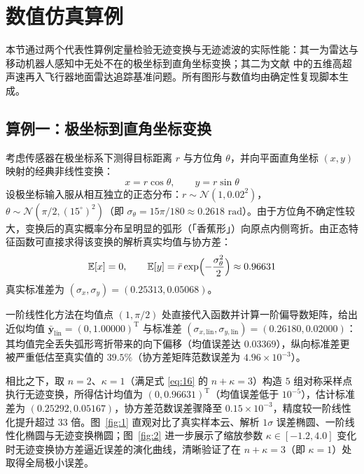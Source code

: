 \section{数值仿真算例}\label{sec:sim}

本节通过两个代表性算例定量检验无迹变换与无迹滤波的实际性能：其一为雷达与移动机器人感知中无处不在的极坐标到直角坐标变换；其二为文献 \cite{r06,r08} 中的五维高超声速再入飞行器地面雷达追踪基准问题。所有图形与数值均由确定性复现脚本生成。

\subsection{算例一：极坐标到直角坐标变换}\label{sec:sim-polar}

考虑传感器在极坐标系下测得目标距离 $r$ 与方位角 $\theta$，并向平面直角坐标 $(x, y)$ 映射的经典非线性变换：
\begin{equation}\label{eq:19}
x = r \cos\theta, \qquad y = r \sin\theta
\end{equation}
设极坐标输入服从相互独立的正态分布：$r \sim \mathcal{N}(1, 0.02^2)$，$\theta \sim \mathcal{N}(\pi/2, (15^\circ)^2)$（即 $\sigma_\theta = 15\pi/180 \approx 0.2618\text{ rad}$）。由于方位角不确定性较大，变换后的真实概率分布呈明显的弧形（「香蕉形」）向原点内侧弯折。由正态特征函数可直接求得该变换的解析真实均值与协方差：
\begin{equation}\label{eq:20}
\mathbb{E}[x] = 0, \qquad \mathbb{E}[y] = \bar{r}\exp\Bigl(-\frac{\sigma_\theta^2}{2}\Bigr) \approx 0.96631
\end{equation}
真实标准差为 $(\sigma_x, \sigma_y) = (0.25313, 0.05068)$。

一阶线性化方法在均值点 $(1, \pi/2)$ 处直接代入函数并计算一阶偏导数矩阵，给出近似均值 $\bar{\bm{y}}_{\text{lin}} = (0, 1.00000)^{\mathrm{T}}$ 与标准差 $(\sigma_{x,\text{lin}}, \sigma_{y,\text{lin}}) = (0.26180, 0.02000)$：其均值完全丢失弧形弯折带来的向下偏移（均值误差达 $0.03369$），纵向标准差更被严重低估至真实值的 $39.5\%$（协方差矩阵范数误差为 $4.96 \times 10^{-3}$）。

相比之下，取 $n = 2$、$\kappa = 1$（满足式 \eqref{eq:16} 的 $n + \kappa = 3$）构造 $5$ 组对称采样点执行无迹变换，所得估计均值为 $(0, 0.96631)^{\mathrm{T}}$（均值误差低于 $10^{-5}$），估计标准差为 $(0.25292, 0.05167)$，协方差范数误差骤降至 $0.15 \times 10^{-3}$，精度较一阶线性化提升超过 $33$ 倍。图~\ref{fig:1} 直观对比了真实样本云、解析 $1\sigma$ 误差椭圆、一阶线性化椭圆与无迹变换椭圆；图~\ref{fig:2} 进一步展示了缩放参数 $\kappa \in [-1.2, 4.0]$ 变化时无迹变换协方差逼近误差的演化曲线，清晰验证了在 $n + \kappa = 3$（即 $\kappa = 1$）处取得全局极小误差。

